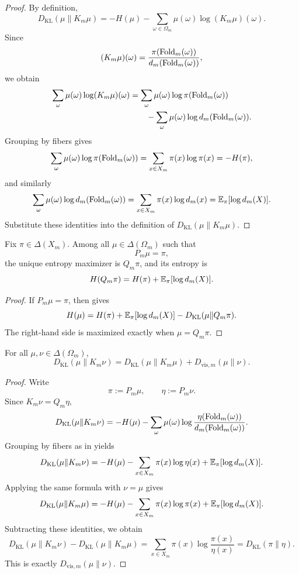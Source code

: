 \begin{proof}
By definition,
\[
  D_{\mathrm{KL}}(\mu\|K_m\mu)
  =
  -H(\mu)-\sum_{\omega\in\Omega_m}\mu(\omega)\log (K_m\mu)(\omega).
\]
Since
\[
  (K_m\mu)(\omega)=\frac{\pi(\mathrm{Fold}_m(\omega))}{d_m(\mathrm{Fold}_m(\omega))},
\]
we obtain
\begin{align*}
  \sum_{\omega}\mu(\omega)\log (K_m\mu)(\omega)
  &=
  \sum_{\omega}\mu(\omega)\log\pi(\mathrm{Fold}_m(\omega)) \\
  &\qquad
  -\sum_{\omega}\mu(\omega)\log d_m(\mathrm{Fold}_m(\omega)).
\end{align*}
Grouping by fibers gives
\[
  \sum_{\omega}\mu(\omega)\log\pi(\mathrm{Fold}_m(\omega))
  =
  \sum_{x\in X_m}\pi(x)\log \pi(x)
  =
  -H(\pi),
\]
and similarly
\[
  \sum_{\omega}\mu(\omega)\log d_m(\mathrm{Fold}_m(\omega))
  =
  \sum_{x\in X_m}\pi(x)\log d_m(x)
  =
  \mathbb{E}_\pi[\log d_m(X)].
\]
Substitute these identities into the definition of
\(D_{\mathrm{KL}}(\mu\|K_m\mu)\).
\end{proof}

\begin{corollary}
\label{cor:max-entropy-visible}
Fix \(\pi\in\Delta(X_m)\).  Among all \(\mu\in\Delta(\Omega_m)\) such that
\[
  P_m\mu=\pi,
\]
the unique entropy maximizer is \(Q_m\pi\), and its entropy is
\[
  H(Q_m\pi)=H(\pi)+\mathbb{E}_\pi[\log d_m(X)].
\]
\end{corollary}

\begin{proof}
If \(P_m\mu=\pi\), then  gives
\[
  H(\mu)
  =
  H(\pi)+\mathbb{E}_\pi[\log d_m(X)]-D_{\mathrm{KL}}(\mu\|Q_m\pi).
\]
The right-hand side is maximized exactly when
\(\mu=Q_m\pi\).
\end{proof}

\begin{theorem}
\label{thm:kl-pythagorean}
For all \(\mu,\nu\in\Delta(\Omega_m)\),
\[
  D_{\mathrm{KL}}(\mu\|K_m\nu)
  =
  D_{\mathrm{KL}}(\mu\|K_m\mu)+D_{\mathrm{vis},m}(\mu\|\nu).
\]
\end{theorem}

\begin{proof}
Write
\[
  \pi:=P_m\mu,
  \qquad
  \eta:=P_m\nu.
\]
Since \(K_m\nu=Q_m\eta\),
\[
  D_{\mathrm{KL}}(\mu\|K_m\nu)
  =
  -H(\mu)-\sum_{\omega}\mu(\omega)\log\frac{\eta(\mathrm{Fold}_m(\omega))}{d_m(\mathrm{Fold}_m(\omega))}.
\]
Grouping by fibers as in  yields
\[
  D_{\mathrm{KL}}(\mu\|K_m\nu)
  =
  -H(\mu)-\sum_{x\in X_m}\pi(x)\log \eta(x)
  +\mathbb{E}_\pi[\log d_m(X)].
\]
Applying the same formula with \(\nu=\mu\) gives
\[
  D_{\mathrm{KL}}(\mu\|K_m\mu)
  =
  -H(\mu)-\sum_{x\in X_m}\pi(x)\log \pi(x)
  +\mathbb{E}_\pi[\log d_m(X)].
\]
Subtracting these identities, we obtain
\[
  D_{\mathrm{KL}}(\mu\|K_m\nu)-D_{\mathrm{KL}}(\mu\|K_m\mu)
  =
  \sum_{x\in X_m}\pi(x)\log \frac{\pi(x)}{\eta(x)}
  =
  D_{\mathrm{KL}}(\pi\|\eta).
\]
This is exactly \(D_{\mathrm{vis},m}(\mu\|\nu)\).
\end{proof}


